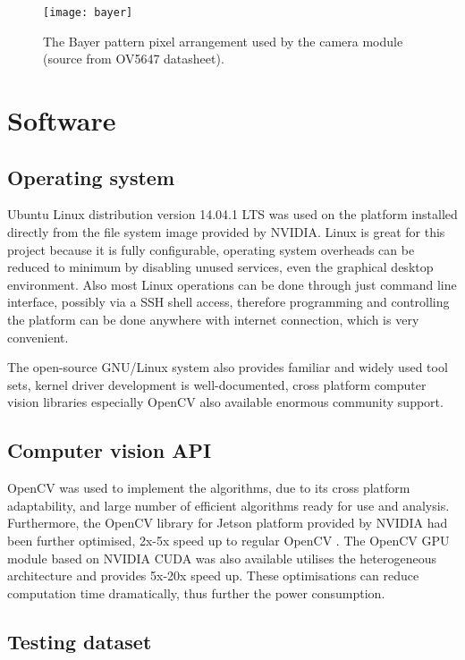 \begin{figure}[H]
  \centering
  \texttt{[image: bayer]}
  \caption{The Bayer pattern pixel arrangement used by the camera module (source from OV5647 datasheet).}
  \label{bayer}
\end{figure}

\section{Software}

\subsection{Operating system}

Ubuntu Linux distribution version 14.04.1 LTS was used on the platform  installed directly from the file system image provided by NVIDIA. Linux is great for this project because it is fully configurable, operating system overheads can be reduced to minimum by disabling unused services, even the graphical desktop environment. Also most Linux operations can be done through just command line interface, possibly via a SSH shell access, therefore programming and controlling the platform can be done anywhere with internet connection, which is very convenient.

The open-source GNU/Linux system also provides familiar and widely used tool sets, kernel driver development is well-documented, cross platform computer vision libraries especially OpenCV  also available  enormous community support.

\subsection{Computer vision API}

OpenCV \cite{opencv} was used to implement the algorithms, due to its cross platform adaptability,  and large number of efficient algorithms ready for use and analysis. Furthermore, the OpenCV library for Jetson platform provided by NVIDIA had been further optimised,  2x-5x speed up  to regular OpenCV \cite{NVIDIA:perf}. The OpenCV GPU module based on NVIDIA CUDA was also available utilises the heterogeneous architecture and provides 5x-20x speed up. These optimisations can reduce computation time dramatically, thus further  the power consumption.

\subsection{Testing dataset}

